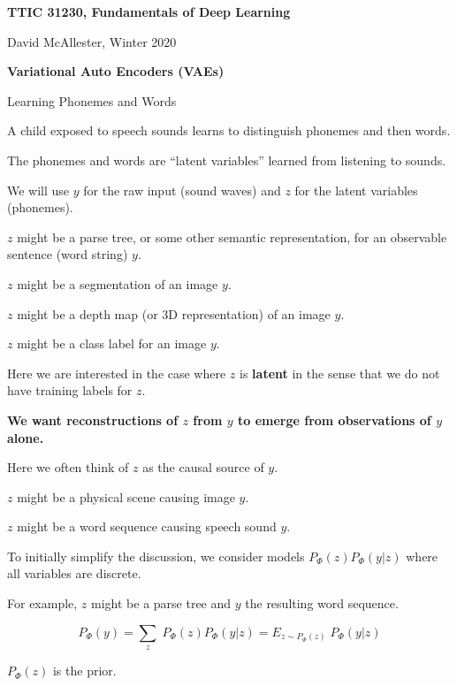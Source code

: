 




{\Huge

  \centerline{\bf TTIC 31230, Fundamentals of Deep Learning}
  \bigskip
  \centerline{David McAllester, Winter 2020}
  \vfill
  \vfill
  \centerline{\bf Variational Auto Encoders (VAEs)}
  \vfill
  \vfill

{Learning Phonemes and Words}

A child exposed to speech sounds learns to distinguish phonemes and then words.

\vfill
The phonemes and words are ``latent variables'' learned from listening to sounds.

\vfill
We will use $y$ for the raw input (sound waves) and $z$ for the latent variables (phonemes).


$z$ might be a parse tree, or some other semantic representation, for an observable sentence (word string) $y$.

\vfill
$z$ might be a segmentation of an image $y$.

\vfill
$z$ might be a depth map (or 3D representation) of an image $y$.

\vfill
$z$ might be a class label for an image $y$.

\vfill
Here we are interested in the case where $z$ is {\bf latent} in the sense that we do not have training labels for $z$.

\vfill
{\bf We want reconstructions of $z$ from $y$ to emerge from observations of $y$ alone.}


Here we often think of $z$ as the causal source of $y$.

\vfill
$z$ might be a physical scene causing image $y$.

\vfill
$z$ might be a word sequence causing speech sound $y$.

\vfill
To initially simplify the discussion, we consider models $P_\Phi(z)P_\Phi(y|z)$ where all variables are discrete.

\vfill
For example, $z$ might be a parse tree and $y$ the resulting word sequence.


{\color{red} $$P_\Phi(y) = \sum_z\;P_\Phi(z)P_\Phi(y|z) = E_{z \sim P_\Phi(z)}\;P_\Phi(y|z)$$}

\vfill
$P_\Phi(z)$ is the prior.

}
